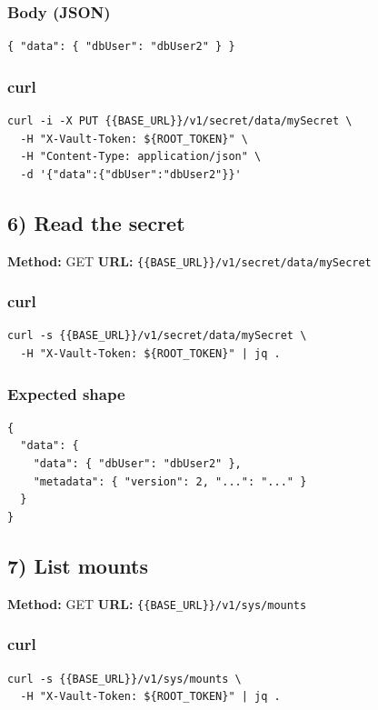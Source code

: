 \documentclass[11pt]{article}
\begin{document}
\subsubsection*{Body (JSON)}
\begin{verbatim}
{ "data": { "dbUser": "dbUser2" } }
\end{verbatim}

\subsubsection*{curl}
\begin{verbatim}
curl -i -X PUT {{BASE_URL}}/v1/secret/data/mySecret \
  -H "X-Vault-Token: ${ROOT_TOKEN}" \
  -H "Content-Type: application/json" \
  -d '{"data":{"dbUser":"dbUser2"}}'
\end{verbatim}

\subsection{6) Read the secret}
\textbf{Method:} GET \quad \textbf{URL:} \texttt{\{\{BASE\_URL\}\}/v1/secret/data/mySecret}

\subsubsection*{curl}
\begin{verbatim}
curl -s {{BASE_URL}}/v1/secret/data/mySecret \
  -H "X-Vault-Token: ${ROOT_TOKEN}" | jq .
\end{verbatim}

\subsubsection*{Expected shape}
\begin{verbatim}
{
  "data": {
    "data": { "dbUser": "dbUser2" },
    "metadata": { "version": 2, "...": "..." }
  }
}
\end{verbatim}

\subsection{7) List mounts}
\textbf{Method:} GET \quad \textbf{URL:} \texttt{\{\{BASE\_URL\}\}/v1/sys/mounts}

\subsubsection*{curl}
\begin{verbatim}
curl -s {{BASE_URL}}/v1/sys/mounts \
  -H "X-Vault-Token: ${ROOT_TOKEN}" | jq .
\end{verbatim}
\end{document}
